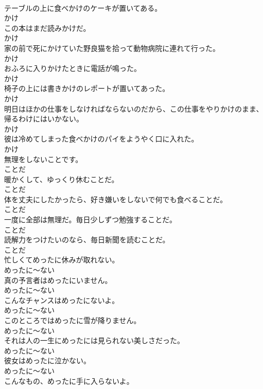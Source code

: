 \documentclass[8pt]{extreport}
\begin{document}
\begin{CJK}{UTF8}{min}
\\	テーブルの上に食べかけのケーキが置いてある。	
\\	かけ	
\\	この本はまだ読みかけだ。	
\\	かけ	
\\	家の前で死にかけていた野良猫を拾って動物病院に連れて行った。	
\\	かけ	
\\	おふろに入りかけたときに電話が鳴った。	
\\	かけ	
\\	椅子の上には書きかけのレポートが置いてあった。	
\\	かけ	
\\	明日はほかの仕事をしなければならないのだから、この仕事をやりかけのまま、帰るわけにはいかない。	
\\	かけ	
\\	彼は冷めてしまった食べかけのパイをようやく口に入れた。	
\\	かけ	
\\	無理をしないことです。	
\\	ことだ	
\\	暖かくして、ゆっくり休むことだ。	
\\	ことだ	
\\	体を丈夫にしたかったら、好き嫌いをしないで何でも食べることだ。	
\\	ことだ	
\\	一度に全部は無理だ。毎日少しずつ勉強することだ。	
\\	ことだ	
\\	読解力をつけたいのなら、毎日新聞を読むことだ。	
\\	ことだ	
\\	忙しくてめったに休みが取れない。	
\\	めったに～ない	
\\	真の予言者はめったにいません。	
\\	めったに～ない	
\\	こんなチャンスはめったにないよ。	
\\	めったに～ない	
\\	このところではめったに雪が降りません。	
\\	めったに～ない	
\\	それは人の一生にめったには見られない美しさだった。	
\\	めったに～ない	
\\	彼女はめったに泣かない。	
\\	めったに～ない	
\\	こんなもの、めったに手に入らないよ。	

\end{CJK}
\end{document}
